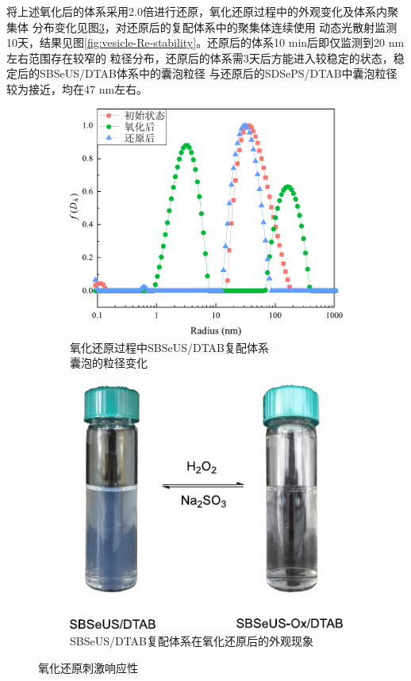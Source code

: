 \documentclass[bachelor,winfonts,replaceperiod]{jnuthesis}
\begin{document}
    将上述氧化后的体系采用2.0倍进行还原，氧化还原过程中的外观变化及体系内聚集体
    分布变化见图\ref{fig:SBSeUS/DTAB氧化还原刺激响应性}，对还原后的复配体系中的聚集体连续使用
    动态光散射监测10天，结果见图\ref{fig:vesicle-Re-stability}。还原后的体系10 min后即仅监测到20 nm左右范围存在较窄的
    粒径分布，还原后的体系需3天后方能进入较稳定的状态，稳定后的SBSeUS/DTAB体系中的囊泡粒径
    与还原后的SDSePS/DTAB中囊泡粒径较为接近，均在47 nm左右。
    \begin{figure}[htbp]
        \begin{subfigure}[]{.5\textwidth}
            \centering
            \includegraphics[width=.98\textwidth]{figure/SBSeUS-redox-radius.pdf}
            \caption{氧化还原过程中SBSeUS/DTAB复配体系\\囊泡的粒径变化}\label{fig:SBSeUS-redox-radius}
        \end{subfigure}%
        \begin{subfigure}[]{.5\textwidth}
            \centering
            \includegraphics[width=.8\textwidth]{figure/scheme-SBSeUS-redox.pdf}
            \caption{SBSeUS/DTAB复配体系在氧化还原后的外观现象}\label{fig:scheme-SBSeUS-redox}
        \end{subfigure}%
        \caption{氧化还原刺激响应性}
        \label{fig:SBSeUS/DTAB氧化还原刺激响应性}
    \end{figure}
    
\end{document}
